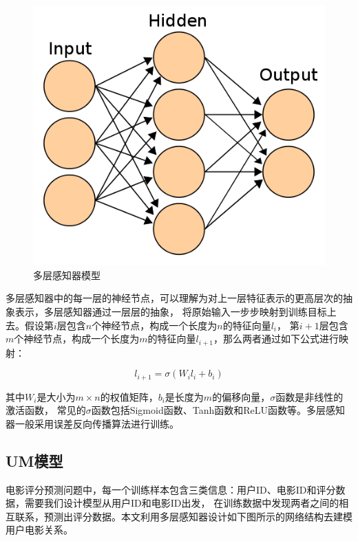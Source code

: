 \begin{figure}[htbp]
\centering
\includegraphics[scale=0.4]{images/mlp.png}
\caption{多层感知器模型}
\label{fig:mlp}
\end{figure}

多层感知器中的每一层的神经节点，可以理解为对上一层特征表示的更高层次的抽象表示，多层感知器通过一层层的抽象，
将原始输入一步步映射到训练目标上去。假设第$i$层包含$n$个神经节点，构成一个长度为$n$的特征向量$l_i$，
第$i+1$层包含$m$个神经节点，构成一个长度为$m$的特征向量$l_{i+1}$，那么两者通过如下公式进行映射：

\begin{equation}
l_{i+1} = \sigma( W_i l_i + b_i )
\end{equation}

其中$W_i$是大小为$m \times n$的权值矩阵，$b_i$是长度为$m$的偏移向量，$\sigma$函数是非线性的激活函数，
常见的$\sigma$函数包括Sigmoid函数、Tanh函数和ReLU函数等。多层感知器一般采用误差反向传播算法进行训练。

\subsection{UM模型}
电影评分预测问题中，每一个训练样本包含三类信息：用户ID、电影ID和评分数据，需要我们设计模型从用户ID和电影ID出发，
在训练数据中发现两者之间的相互联系，预测出评分数据。本文利用多层感知器设计如下图所示的网络结构去建模用户电影关系。

